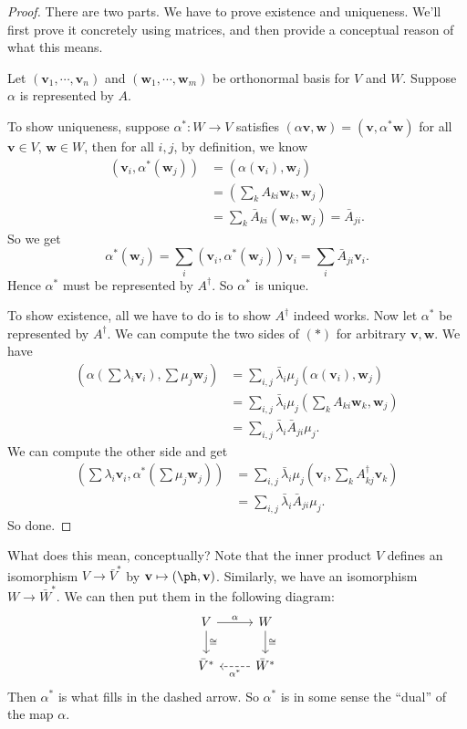 \documentclass[a4paper]{article}
\begin{document}
\begin{proof}
  There are two parts. We have to prove existence and uniqueness. We'll first prove it concretely using matrices, and then provide a conceptual reason of what this means.

  Let $(\mathbf{v}_1, \cdots, \mathbf{v}_n)$ and $(\mathbf{w}_1, \cdots, \mathbf{w}_m)$ be orthonormal basis for $V$ and $W$. Suppose $\alpha$ is represented by $A$.

  To show uniqueness, suppose $\alpha^*: W \to V$ satisfies $(\alpha \mathbf{v}, \mathbf{w}) = (\mathbf{v}, \alpha^* \mathbf{w})$ for all $\mathbf{v} \in V$, $\mathbf{w} \in W$, then for all $i, j$, by definition, we know
  \begin{align*}
    (\mathbf{v}_i, \alpha^*(\mathbf{w}_j)) &= (\alpha(\mathbf{v}_i), \mathbf{w}_j) \\
    &= \left(\sum_k A_{ki} \mathbf{w}_k, \mathbf{w}_j\right)\\
    &= \sum_k \bar{A}_{ki} (\mathbf{w}_k, \mathbf{w}_j) = \bar{A}_{ji}.
  \end{align*}
  So we get
  \[
    \alpha^*(\mathbf{w}_j) = \sum_i (\mathbf{v}_i, \alpha^*(\mathbf{w}_j)) \mathbf{v}_i = \sum_i \bar{A}_{ji} \mathbf{v}_i.
  \]
  Hence $\alpha^*$ must be represented by $A^\dagger$. So $\alpha^*$ is unique.

  To show existence, all we have to do is to show $A^\dagger$ indeed works. Now let $\alpha^*$ be represented by $A^\dagger$. We can compute the two sides of $(*)$ for arbitrary $\mathbf{v}, \mathbf{w}$. We have
  \begin{align*}
    \left(\alpha\left(\sum \lambda_i \mathbf{v}_i\right), \sum \mu_j \mathbf{w}_j\right) &= \sum_{i, j} \bar{\lambda}_i \mu_j (\alpha(\mathbf{v}_i), \mathbf{w}_j)\\
    &= \sum_{i, j} \bar{\lambda}_i \mu_j \left(\sum_k A_{ki} \mathbf{w}_k, \mathbf{w}_j\right)\\
    &= \sum_{i, j} \bar{\lambda}_i \bar{A}_{ji} \mu_j.
  \end{align*}
  We can compute the other side and get
  \begin{align*}
    \left(\sum \lambda_i \mathbf{v}_i, \alpha^*\left(\sum \mu_j \mathbf{w}_j\right)\right) &= \sum_{i, j} \bar{\lambda}_i \mu_j \left(\mathbf{v}_i, \sum_k A^{\dagger}_{kj} \mathbf{v}_k\right)\\
    &= \sum_{i, j} \bar{\lambda}_i \bar{A}_{ji} \mu_j.
  \end{align*}
  So done.
\end{proof}
What does this mean, conceptually? Note that the inner product $V$ defines an isomorphism $V \to \bar{V}^*$ by $\mathbf{v} \mapsto (\ph,\mathbf{v})$. Similarly, we have an isomorphism $W \to \bar{W}^*$. We can then put them in the following diagram:
\[
  \begin{tikzcd}
    V \ar[r, "\alpha"] \ar[d, "\cong"] & W \ar[d, "\cong"]\\
    \bar{V}^* & \bar{W}^* \ar[l, dashed, "\alpha^*"]
  \end{tikzcd}
\]
Then $\alpha^*$ is what fills in the dashed arrow. So $\alpha^*$ is in some sense the ``dual'' of the map $\alpha$.
\end{document}
